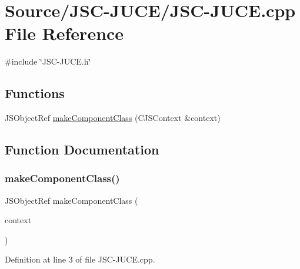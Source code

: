 \hypertarget{_j_s_c-_j_u_c_e_8cpp}{}\section{Source/\+J\+S\+C-\/\+J\+U\+C\+E/\+J\+S\+C-\/\+J\+U\+CE.cpp File Reference}
\label{_j_s_c-_j_u_c_e_8cpp}
{\ttfamily \#include \char`\"{}J\+S\+C-\/\+J\+U\+C\+E.\+h\char`\"{}}\newline
\subsection*{Functions}
\begin{DoxyCompactItemize}
\item 
J\+S\+Object\+Ref \mbox{\hyperlink{_j_s_c-_j_u_c_e_8cpp_a4979f6178ff7382e34f456a6e48b3998}{make\+Component\+Class}} (C\+J\+S\+Context \&context)
\end{DoxyCompactItemize}


\subsection{Function Documentation}
\mbox{\label{_j_s_c-_j_u_c_e_8cpp_a4979f6178ff7382e34f456a6e48b3998}} 
\subsubsection{\texorpdfstring{make\+Component\+Class()}{makeComponentClass()}}
{\footnotesize\ttfamily J\+S\+Object\+Ref make\+Component\+Class (\begin{DoxyParamCaption}\item[{C\+J\+S\+Context \&}]{context }\end{DoxyParamCaption})}



Definition at line 3 of file J\+S\+C-\/\+J\+U\+C\+E.\+cpp.

